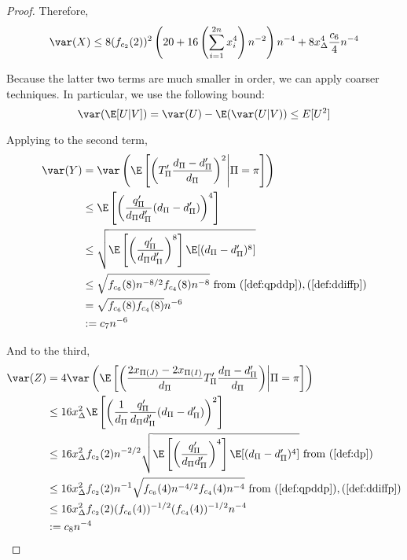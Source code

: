 \begin{proof}
  Therefore,
  \begin{equation*}
    \var(X) \leq 8(f_{c_2}(2))^2 \left ( 20 + 16 \left ( \sum_{i=1}^{2n} x_{i}^4 \right )n^{-2}
    \right ) n^{-4}
    + 8x_{\Delta}^4 \frac{c_6}{4} n^{-4}
  \end{equation*}

  Because the latter two terms are much smaller in order, we can apply
  coarser techniques.  In particular, we use the following bound:
  \begin{equation*}
    \var (\E[U|V]) = \var(U) - \E (\var (U|V)) \leq E[U^2]
  \end{equation*}

  Applying to the second term,
  \begin{align*}
    \var(Y) &= \var \left ( \E \left [ \left ( T'_{\Pi}\frac{d_{\Pi}-d_{\Pi}'}{d_{\Pi}} \right )^2
        \middle | \Pi = \pi \right ] \right ) \\
    &\leq \E \left [ \left ( \frac{q_{\Pi}'}{d_{\Pi}d_{\Pi}'} (d_{\Pi}-d_{\Pi}') \right )^4 \right ] \\
    &\leq \sqrt{\E \left [ \left ( \frac{q_{\Pi}'}{d_{\Pi}d_{\Pi}'} \right )^8 \right ]
      \E [(d_{\Pi}-d_{\Pi}')^8]} \\
    &\leq \sqrt{f_{c_6}(8) n^{-8/2} f_{c_4}(8) n^{-8}} \text{ from }
    (\ref{def:qpddp}),(\ref{def:ddiffp}) \\
    &= \sqrt{f_{c_6}(8)f_{c_4}(8)}n^{-6} \\
    &:= c_7 n^{-6}
  \end{align*}

  And to the third,
  \begin{align*}
    \var(Z) &= 4 \var \left ( \E \left [ \left ( \frac{2x_{\Pi(J)}-2x_{\Pi(I)}}{d_{\Pi}}
          T_{\Pi}'\frac{d_{\Pi}-d_{\Pi}'}{d_{\Pi}} \right ) \middle | \Pi = \pi \right ] \right ) \\
    &\leq 16 x_{\Delta}^2 \E \left [ \left ( \frac{1}{d_{\Pi}} \frac{q_{\Pi}'}{d_{\Pi}d_{\Pi}'}
        (d_{\Pi}-d_{\Pi}') \right )^2 \right ] \\
    &\leq 16 x_{\Delta}^2 f_{c_2}(2) n^{-2/2} \sqrt{\E \left [ \left (
          \frac{q_{\Pi}'}{d_{\Pi}d_{\Pi}'} \right )^4 \right ] \E[(d_{\Pi}-d_{\Pi}')^4]
    } \text{ from } (\ref{def:dp}) \\
    &\leq 16 x_{\Delta}^2 f_{c_2}(2) n^{-1} \sqrt{f_{c_6}(4) n^{-4/2} f_{c_4}(4) n^{-4}}
    \text{ from } (\ref{def:qpddp}),(\ref{def:ddiffp}) \\
    &\leq 16 x_{\Delta}^2 f_{c_2}(2) (f_{c_6}(4))^{-1/2} (f_{c_4}(4))^{-1/2} n^{-4} \\
    &:= c_8 n^{-4}
  \end{align*}


\end{proof}

